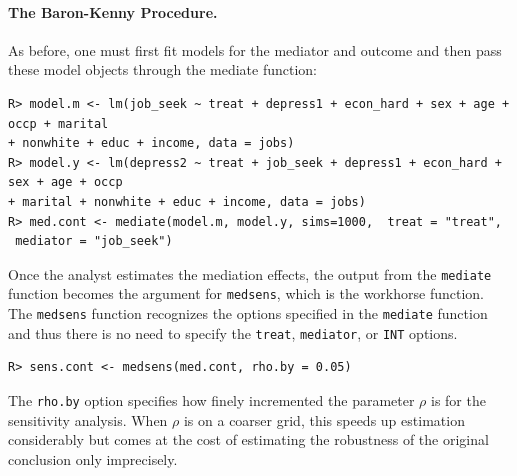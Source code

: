 \documentclass[11pt,letterpaper]{article}
\theoremstyle{plain}
\begin{document}
\paragraph{The Baron-Kenny Procedure.}
As before, one must first fit models for the mediator and outcome and then pass these model objects through the mediate function:
\begin{verbatim}
R> model.m <- lm(job_seek ~ treat + depress1 + econ_hard + sex + age + occp + marital
+ nonwhite + educ + income, data = jobs)
R> model.y <- lm(depress2 ~ treat + job_seek + depress1 + econ_hard + sex + age + occp
+ marital + nonwhite + educ + income, data = jobs)
R> med.cont <- mediate(model.m, model.y, sims=1000,  treat = "treat",
 mediator = "job_seek")
\end{verbatim}

Once the analyst estimates the mediation effects, the output from the
{\tt mediate} function becomes the argument for \texttt{medsens},
which is the workhorse function. The {\tt medsens} function
recognizes the options specified in the {\tt mediate} function and
thus there is no need to specify the \texttt{treat}, \texttt{mediator}, or
\texttt{INT} options.
\begin{verbatim}
R> sens.cont <- medsens(med.cont, rho.by = 0.05)
\end{verbatim}
The \texttt{rho.by} option specifies how finely incremented the parameter $\rho$
is for the sensitivity analysis. When $\rho$ is on a coarser grid, this speeds
up estimation considerably but comes at the cost of estimating the
robustness of the original conclusion only imprecisely.
\end{document}
